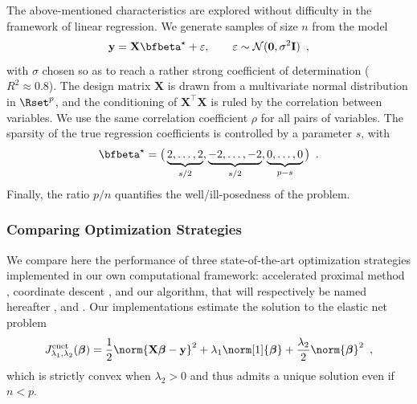 The above-mentioned characteristics are explored without difficulty in the
framework of linear regression. We generate samples of size $n$ from the model
\begin{equation*}
  \mathbf{y} = \mathbf{X} \bfbeta^\star + \varepsilon, \qquad
  \varepsilon \sim\mathcal{N}(\mathbf{0},\sigma^2\mathbf{I})
  \enspace,
\end{equation*}
with $\sigma$ chosen so as to reach a rather strong  coefficient of
determination ($R^2\approx 0.8$).  The design matrix $\mathbf{X}$ is drawn from
a multivariate normal distribution in $\Rset^p$, and the conditioning of
$\mathbf{X}^\intercal\mathbf{X}$ is ruled by the correlation between variables. 
We use the same correlation coefficient $\rho$ for all pairs of variables.
The sparsity of the true regression coefficients is controlled by a parameter
$s$, with
\begin{equation*}
  \bfbeta^\star = \big(\underbrace{2,\dots,2}_{s/2} , \underbrace{-2,\dots,-2}_{s/2} , \underbrace{0,\dots,0}_{p-s} \big)
  \enspace.
\end{equation*}
Finally, the ratio $p/n$
quantifies the well/ill-posedness of the problem.


 
\subsubsection{Comparing Optimization Strategies} 

We compare here the performance of three state-of-the-art optimization
strategies implemented in our own computational framework:
accelerated proximal method \citep[see, e.g.,][]{2009_SIAM_Beck},
coordinate descent \citep[popularized by][]{2007_AAS_Friedman},
and our algorithm, that will respectively be named hereafter ,
 and .
Our implementations estimate the solution to the elastic net problem
\begin{equation}
  \label{eq:enet}
    J_{\lambda_1,
    \lambda_2}^{\text{enet}}(\boldsymbol\beta)= \frac{1}{2}
  \norm{\mathbf{X}\boldsymbol\beta - \mathbf{y}}^2 +
  \lambda_1 \norm[1]{\boldsymbol\beta} + \frac{\lambda_2}{2} \norm{\boldsymbol\beta}^2
  \enspace,
\end{equation}
which is strictly convex when $\lambda_2>0$ and thus admits a unique
solution even if $n<p$.

